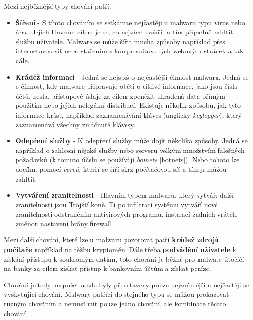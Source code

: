 Mezi nejběžnější typy chování patří:
\begin{itemize}
    \item \textbf{Šíření} - S tímto chováním se setkámae nejčastěji u malwaru typu virus nebo červ. Jejich hlavním cílem je se, co nejvíce rozšířit a tím případně zahltit službu uživatele. Malware se může šířit mnoha způsoby například přes internetovou síť nebo stažením z kompromitovaných webových stránek a tak dále.
    \item \textbf{Kráděž informací} - Jedná se nejspíš o nejčastější činnost malwaru. Jedná se o čínnost, kdy malware připravuje oběti o citlivé informace, jako jsou čísla účtů, hesla, přístupové údaje za cílem zpeněžit ukradená data přímým použitím nebo jejich nelegální distribucí. Existuje několik způsobů, jak tyto informace krást, například zaznamenávání kláves (anglicky \textit{keylogger}), který zaznamenává všechny zmáčnuté klávesy.
    \item \textbf{Odepření služby} - K odepření služby může dojít několika způsoby. Jedná se například o zahlcení nějaké služby nebo serveru velkým množstvím falešných požadavků (k tomuto účelu se používájí \textit{botnets} \ref{botnets}). Nebo tohoto lze docílim pomocí \textit{červů}, kterří se šíří skrz počítačovou síť a tím ji můžou zahltit.
    \item \textbf{Vytváření zranitelnosti} - Hlavním typem malwaru, který vytváří další zranitelnosti jsou Trojští koně. Ti po infiltraci systému vytváří nové zranitelnosti odstraněním antivirových programů, instalací zadních vrátek, změnou nastavení brány firewall.
\end{itemize}

Mezi další chování, které lze u malwaru pozorovat patří \textbf{krádež zdrojů počítaře} například na těžbu kryptoměn. Dále třeba \textbf{podvádění uživatele} k získání přístupu k soukromým datům, toto chování je běžné pro malware útočíčí na banky za cílem získat přístup k bankovním účtům a získat peníze.

Chování je tedy nespočet a zde byly představeny pouze nejznámější a nejčastěji se vyskytující chování. Malwary patřící do stejného typu se můžou prokazovat různým chováním a nemusí mít pouze jedno chování, ale kombinace těchto chování.
\newpage
